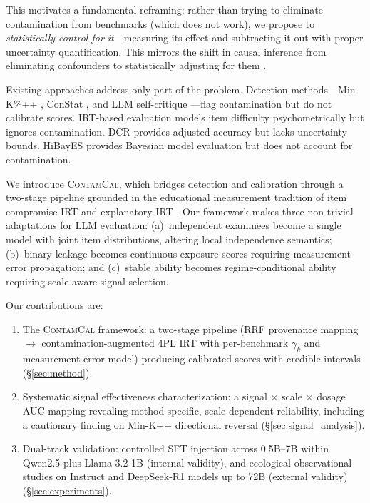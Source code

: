 \documentclass[11pt,a4paper]{article}
\newcommand{\contamcal}{\textsc{ContamCal}}
\begin{document}
This motivates a fundamental reframing: rather than trying to eliminate contamination from benchmarks (which does not work), we propose to \emph{statistically control for it}---measuring its effect and subtracting it out with proper uncertainty quantification.
This mirrors the shift in causal inference from eliminating confounders to statistically adjusting for them \citep{rosenbaum1983central}.

Existing approaches address only part of the problem.
Detection methods---Min-K\%++ \citep{shi2024detecting}, ConStat \citep{dekoninck2024constat}, and LLM self-critique \citep{yang2023rethinking}---flag contamination but do not calibrate scores.
IRT-based evaluation \citep{lalor2024benchmarking,polo2024tinybenchmarks} models item difficulty psychometrically but ignores contamination.
DCR \citep{dong2024generalization} provides adjusted accuracy but lacks uncertainty bounds.
HiBayES \citep{zhuang2024hibayes} provides Bayesian model evaluation but does not account for contamination.

We introduce \contamcal{}, which bridges detection and calibration through a two-stage pipeline grounded in the educational measurement tradition of item compromise IRT \citep{eckerly2017detecting,sinharay2017use} and explanatory IRT \citep{deboeck2004explanatory}.
Our framework makes three non-trivial adaptations for LLM evaluation: (a)~independent examinees become a single model with joint item distributions, altering local independence semantics; (b)~binary leakage becomes continuous exposure scores requiring measurement error propagation; and (c)~stable ability becomes regime-conditional ability requiring scale-aware signal selection.

Our contributions are:
\begin{enumerate}
\item The \contamcal{} framework: a two-stage pipeline (RRF provenance mapping $\to$ contamination-augmented 4PL IRT with per-benchmark $\gamma_k$ and measurement error model) producing calibrated scores with credible intervals (\S\ref{sec:method}).
\item Systematic signal effectiveness characterization: a signal $\times$ scale $\times$ dosage AUC mapping revealing method-specific, scale-dependent reliability, including a cautionary finding on Min-K++ directional reversal (\S\ref{sec:signal_analysis}).
\item Dual-track validation: controlled SFT injection across 0.5B--7B within Qwen2.5 plus Llama-3.2-1B (internal validity), and ecological observational studies on Instruct and DeepSeek-R1 models up to 72B (external validity) (\S\ref{sec:experiments}).
\end{enumerate}
\end{document}

